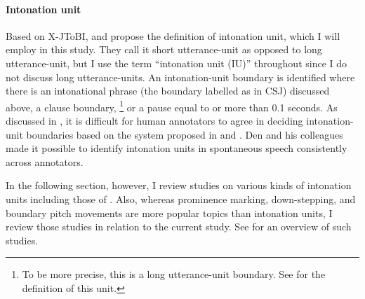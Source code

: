\paragraph{Intonation unit}

Based on X-JToBI,
 and  propose the definition of intonation unit,
which I will employ in this study.
They call it short utterance-unit as opposed to long utterance-unit,
but I use the term ``intonation unit (IU)'' throughout
since I do not discuss long utterance-units.
An intonation-unit boundary is identified
where there is an intonational phrase (the boundary labelled as  in CSJ) discussed above,
a clause boundary,%
	\footnote{
	To be more precise, this is a long utterance-unit boundary.
	See  for the definition of this unit.
	}
or
a pause equal to or more than 0.1 seconds.
As discussed in ,
it is difficult for human annotators to agree in deciding intonation-unit boundaries based on the system proposed in  and .
Den and his colleagues made it possible to identify intonation units in spontaneous speech consistently across annotators.

In the following section, however,
I review studies on various kinds of intonation units including those of .
Also, whereas prominence marking, down-stepping, and boundary pitch movements are more popular topics than intonation units,
I review those studies in relation to the current study.
See  for an overview of such studies.


%
%
%
%





